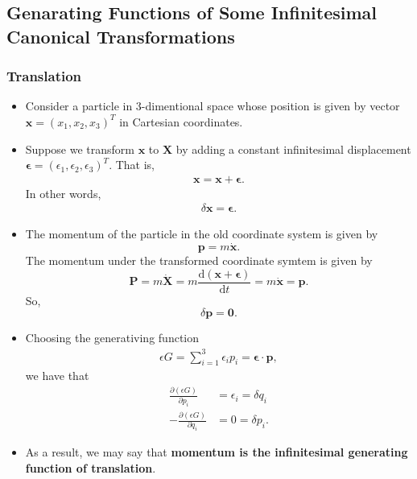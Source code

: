 \documentclass[10pt]{article}
\newcommand{\dee}{\mathrm{d}}
\newcommand{\ve}[1]{\mathbf{#1}}
\newcommand{\ves}[1]{\boldsymbol{#1}}
\begin{document}
  \subsection{Genarating Functions of Some Infinitesimal Canonical Transformations}

  \subsubsection{Translation}

  \begin{itemize}
    \item Consider a particle in 3-dimentional space whose position is given by vector $\ve{x} = (x_1,x_2,x_3)^T$ in Cartesian coordinates.

    \item Suppose we transform $\ve{x}$ to $\ve{X}$ by adding a constant infinitesimal displacement $\boldsymbol{\epsilon} = (\epsilon_1, \epsilon_2, \epsilon_3)^T$. That is,
    \begin{align*}
      \ve{x} = \ve{x} + \boldsymbol{\epsilon}.
    \end{align*}
    In other words,
    \begin{align*}
      \delta \ve{x} = \boldsymbol{\epsilon}.
    \end{align*}

    \item The momentum of the particle in the old coordinate system is given by $$\ve{p} = m\dot{\ve{x}}.$$ The momentum under the transformed coordinate symtem is given by $$\ve{P} = m\dot{\ve{X}} = m \frac{\dee (\ve{x} + \ves{\epsilon})}{\dee t} = m\dot{\ve{x}} = \ve{p}.$$
    So, $$\delta \ve{p} = \ve{0}.$$

    \item Choosing the generativing function
    \begin{align*}
      \epsilon G = \sum_{i=1}^3 \epsilon_i p_i = \ves{\epsilon} \cdot \ve{p},
    \end{align*}
    we have that
    \begin{align*}
      \frac{\partial (\epsilon G)}{\partial p_i} &= \epsilon_i  = \delta q_i \\
      -\frac{\partial (\epsilon G)}{\partial q_i} &= 0 = \delta p_i.
    \end{align*}    

    \item As a result, we may say that {\bf momentum is the infinitesimal generating function of translation}.
  \end{itemize}
\end{document}

